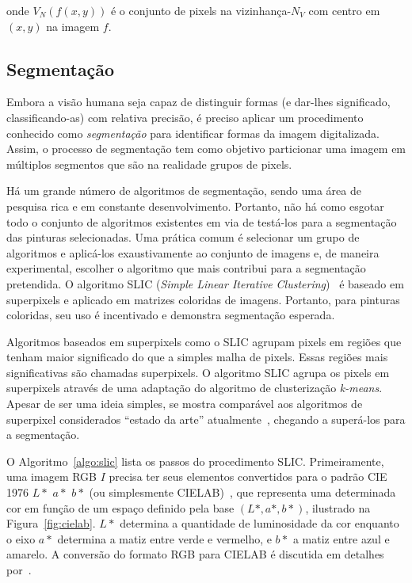 \noindent onde $V_N(f(x,y))$ é o conjunto de pixels na vizinhança-$N_V$ com
centro em $(x,y)$ na imagem $f$.

\subsection{Segmentação}
\label{sec:slic}

Embora a visão humana seja capaz de distinguir formas (e dar-lhes significado,
classificando-as) com relativa precisão, é preciso aplicar um procedimento
conhecido como \emph{segmentação} para identificar formas da imagem
digitalizada. Assim, o processo de segmentação tem como objetivo particionar uma
imagem em múltiplos segmentos que são na realidade grupos de pixels.

Há um grande número de algoritmos de segmentação, sendo uma área de pesquisa
rica e em constante desenvolvimento. Portanto, não há como esgotar todo o
conjunto de algoritmos existentes em via de testá-los para a segmentação das
pinturas selecionadas. Uma prática comum é selecionar um grupo de algoritmos e
aplicá-los exaustivamente ao conjunto de imagens e, de maneira experimental,
escolher o algoritmo que mais contribui para a segmentação pretendida. O
algoritmo SLIC (\textit{Simple Linear Iterative Clustering})~\cite{slic} é baseado em
superpixels e aplicado em matrizes coloridas de imagens. Portanto, para pinturas
coloridas, seu uso é incentivado e demonstra segmentação esperada.

Algoritmos baseados em superpixels como o SLIC agrupam pixels em regiões
que tenham maior significado do que a simples malha de pixels. Essas regiões
mais significativas são chamadas superpixels. O algoritmo SLIC agrupa os pixels
em superpixels através de uma adaptação do algoritmo de clusterização
\emph{k-means}. Apesar de ser uma ideia simples, se mostra comparável aos
algoritmos de superpixel considerados ``estado da arte'' atualmente~\cite{slic},
chegando a superá-los para a segmentação.

O Algoritmo~\ref{algo:slic} lista os passos do procedimento SLIC. Primeiramente,
uma imagem RGB $I$ precisa ter seus elementos convertidos para o padrão CIE 1976
$L*$ $a*$ $b*$ (ou simplesmente CIELAB)~\cite{cielab1}, que representa uma
determinada cor em função de um espaço definido pela base $(L*, a*, b*)$,
ilustrado na Figura~\ref{fig:cielab}. $L*$ determina a quantidade de
luminosidade da cor enquanto o eixo $a*$ determina a matiz entre verde e
vermelho, e $b*$ a matiz entre azul e amarelo. A conversão do
formato RGB para CIELAB é discutida em detalhes por~\citeauthor{cielab2}.

